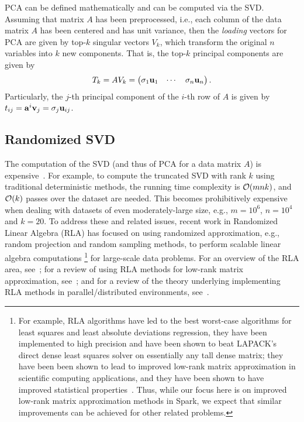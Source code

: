 PCA can be defined mathematically and can be computed via the SVD.
Assuming that matrix $A$ has been preprocessed, i.e., each column of the data matrix $A$ has been centered and has unit variance, then the {\it loading} vectors for PCA are given by top-$k$ singular vectors $V_k$, which transform the original $n$ variables into $k$ new components. 
That is, the top-$k$ principal components are given by 
\begin{equation}
  T_k = A V_k = \begin{pmatrix} \sigma_1 \mathbf{u}_1 & \cdots & \sigma_n \mathbf{u}_n \end{pmatrix}.
\end{equation}
Particularly, the $j$-th principal component of the $i$-th row of $A$ is given by 
$t_{ij} = \mathbf{a}^i \mathbf{v}_j = \sigma_j \mathbf{u}_{ij}$.


\subsection{Randomized SVD}

The computation of the SVD (and thus of PCA for a data matrix $A$) is expensive~\cite{GVL96}.
For example, to compute the truncated SVD with rank $k$ using traditional deterministic methods, the running time complexity is $\operatorname{\mathcal{O}}(mnk)$, and $\operatorname{\mathcal{O}}(k)$ passes over the dataset are needed.
This  becomes prohibitively expensive when dealing with datasets of even moderately-large size, e.g., $m = 10^6$, $n = 10^4$ and $k = 20$. 
To address these and related issues, recent work in Randomized Linear Algebra (RLA) has focused on using randomized approximation, e.g., random projection and random sampling methods, to perform scalable linear algebra computations
\footnote{For example, RLA algorithms have led to the best worst-case algorithms for least squares and least absolute deviations regression, they have been implemented to high precision and have been shown to beat LAPACK's direct dense least squares solver on essentially any tall dense matrix; they have been been shown to lead to improved low-rank matrix approximation in scientific computing applications, and they have been shown to have improved statistical properties~\cite{Mah-mat-rev_BOOK}.  Thus, while our focus here is on improved low-rank matrix approximation methods in Spark, we expect that similar improvements can be achieved for other related problems.} for large-scale data problems.
For an overview of the RLA area, see~\cite{Mah-mat-rev_BOOK}; for a review of using RLA methods for low-rank matrix approximation, see~\cite{HMT09_SIREV}; and for a review of the theory underlying implementing RLA methods in parallel/distributed environments, see~\cite{YMM15_TR}.

